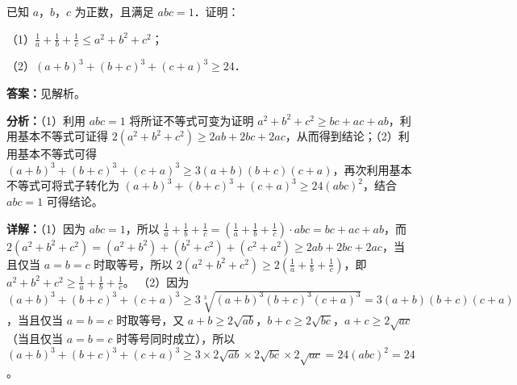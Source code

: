 \begin{question}[points=10]
已知 $a$，$b$，$c$ 为正数，且满足 $abc=1$．证明：

（1）$\frac{1}{a} + \frac{1}{b} + \frac{1}{c} \le a^2 + b^2 + c^2$；

（2）$(a+b)^3 + (b+c)^3 + (c+a)^3 \ge 24$．
\begin{solution}
\textbf{答案：}见解析。

\textbf{分析：}（1）利用 $abc=1$ 将所证不等式可变为证明 $a^2+b^2+c^2 \ge bc+ac+ab$，利用基本不等式可证得 $2(a^2+b^2+c^2) \ge 2ab+2bc+2ac$，从而得到结论；（2）利用基本不等式可得 $(a+b)^3+(b+c)^3+(c+a)^3 \ge 3(a+b)(b+c)(c+a)$，再次利用基本不等式可将式子转化为 $(a+b)^3+(b+c)^3+(c+a)^3 \ge 24(abc)^2$，结合 $abc=1$ 可得结论。

\textbf{详解：}（1）因为 $abc=1$，所以 $\frac{1}{a}+\frac{1}{b}+\frac{1}{c} = (\frac{1}{a}+\frac{1}{b}+\frac{1}{c})\cdot abc = bc+ac+ab$，而 $2(a^2+b^2+c^2) = (a^2+b^2)+(b^2+c^2)+(c^2+a^2) \ge 2ab+2bc+2ac$，当且仅当 $a=b=c$ 时取等号，所以 $2(a^2+b^2+c^2) \ge 2(\frac{1}{a}+\frac{1}{b}+\frac{1}{c})$，即 $a^2+b^2+c^2 \ge \frac{1}{a}+\frac{1}{b}+\frac{1}{c}$。
（2）因为 $(a+b)^3+(b+c)^3+(c+a)^3 \ge 3\sqrt[3]{(a+b)^3(b+c)^3(c+a)^3} = 3(a+b)(b+c)(c+a)$，当且仅当 $a=b=c$ 时取等号，又 $a+b \ge 2\sqrt{ab}$，$b+c \ge 2\sqrt{bc}$，$a+c \ge 2\sqrt{ac}$（当且仅当 $a=b=c$ 时等号同时成立），所以 $(a+b)^3+(b+c)^3+(c+a)^3 \ge 3 \times 2\sqrt{ab} \times 2\sqrt{bc} \times 2\sqrt{ac} = 24(abc)^2 = 24$。
\end{solution}
\end{question}

